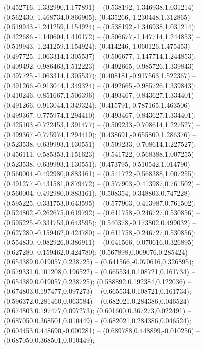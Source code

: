  (0.452716,-1.332990,1.177891) -- (0.538192,-1.346938,1.031214) -- (0.562430,-1.468734,0.866905);
 (0.435266,-1.230448,1.312865) -- (0.519943,-1.241259,1.154924) -- (0.538192,-1.346938,1.031214);
 (0.422686,-1.140604,1.410172) -- (0.506677,-1.147714,1.244853) -- (0.519943,-1.241259,1.154924);
 (0.414246,-1.060126,1.475453) -- (0.497725,-1.063314,1.305537) -- (0.506677,-1.147714,1.244853);
 (0.409492,-0.986463,1.512223) -- (0.492665,-0.985726,1.339843) -- (0.497725,-1.063314,1.305537);
 (0.408181,-0.917563,1.522367) -- (0.491266,-0.913044,1.349324) -- (0.492665,-0.985726,1.339843);
 (0.410246,-0.851667,1.506396) -- (0.493467,-0.843627,1.334401) -- (0.491266,-0.913044,1.349324);
 (0.415791,-0.787165,1.463506) -- (0.499367,-0.775974,1.294410) -- (0.493467,-0.843627,1.334401);
 (0.425103,-0.722453,1.391477) -- (0.509233,-0.708614,1.227527) -- (0.499367,-0.775974,1.294410);
 (0.438691,-0.655800,1.286376) -- (0.523538,-0.639993,1.130551) -- (0.509233,-0.708614,1.227527);
 (0.456111,-0.585353,1.151623) -- (0.541722,-0.568388,1.007255) -- (0.523538,-0.639993,1.130551);
 (0.473795,-0.510542,1.014790) -- (0.560004,-0.492980,0.883161) -- (0.541722,-0.568388,1.007255);
 (0.491277,-0.431581,0.879472) -- (0.577903,-0.413987,0.761502) -- (0.560004,-0.492980,0.883161);
 (0.508354,-0.348803,0.747228) -- (0.595225,-0.331753,0.643595) -- (0.577903,-0.413987,0.761502);
 (0.524802,-0.262675,0.619792) -- (0.611758,-0.246727,0.530856) -- (0.595225,-0.331753,0.643595);
 (0.540378,-0.173802,0.499032) -- (0.627280,-0.159462,0.424780) -- (0.611758,-0.246727,0.530856);
 (0.554830,-0.082926,0.386911) -- (0.641566,-0.070616,0.326895) -- (0.627280,-0.159462,0.424780);
 (0.567898,0.009076,0.285424) -- (0.654389,0.019057,0.238725) -- (0.641566,-0.070616,0.326895);
 (0.579331,0.101208,0.196522) -- (0.665534,0.108721,0.161734) -- (0.654389,0.019057,0.238725);
 (0.588892,0.192384,0.122036) -- (0.674803,0.197477,0.097273) -- (0.665534,0.108721,0.161734);
 (0.596372,0.281460,0.063584) -- (0.682021,0.284386,0.046524) -- (0.674803,0.197477,0.097273);
 (0.601600,0.367273,0.022491) -- (0.687050,0.368501,0.010449) -- (0.682021,0.284386,0.046524);
 (0.604453,0.448690,-0.000281) -- (0.689788,0.448899,-0.010256) -- (0.687050,0.368501,0.010449);
